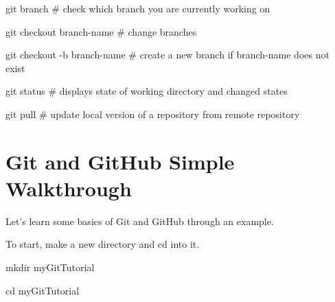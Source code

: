 \documentclass[]{book}
\newenvironment{Shaded}{\begin{snugshade}}{\end{snugshade}}
\newcommand{\FunctionTok}[1]{\textcolor[rgb]{0.00,0.00,0.00}{#1}}
\newcommand{\BuiltInTok}[1]{#1}
\newcommand{\NormalTok}[1]{#1}
\begin{document}
\begin{Shaded}
\begin{Highlighting}[]
\FunctionTok{git}\NormalTok{ branch                            # check which branch you are currently working on}
\end{Highlighting}
\end{Shaded}

\begin{Shaded}
\begin{Highlighting}[]
\FunctionTok{git}\NormalTok{ checkout branch-name            # change branches}
\end{Highlighting}
\end{Shaded}

\begin{Shaded}
\begin{Highlighting}[]
\FunctionTok{git}\NormalTok{ checkout -b branch-name     # create a new branch if branch-name does not exist }
\end{Highlighting}
\end{Shaded}

\begin{Shaded}
\begin{Highlighting}[]
\FunctionTok{git}\NormalTok{ status                            # displays state of working directory and changed states}
\end{Highlighting}
\end{Shaded}

\begin{Shaded}
\begin{Highlighting}[]
\FunctionTok{git}\NormalTok{ pull                                  # update local version of a repository from remote repository}
\end{Highlighting}
\end{Shaded}

\section{Git and GitHub Simple
Walkthrough}\label{git-and-github-simple-walkthrough}

Let's learn some basics of Git and GitHub through an example.

To start, make a new directory and cd into it.

\begin{Shaded}
\begin{Highlighting}[]
\FunctionTok{mkdir}\NormalTok{ myGitTutorial}

\BuiltInTok{cd}\NormalTok{ myGitTutorial}
\end{Highlighting}
\end{Shaded}
\end{document}
